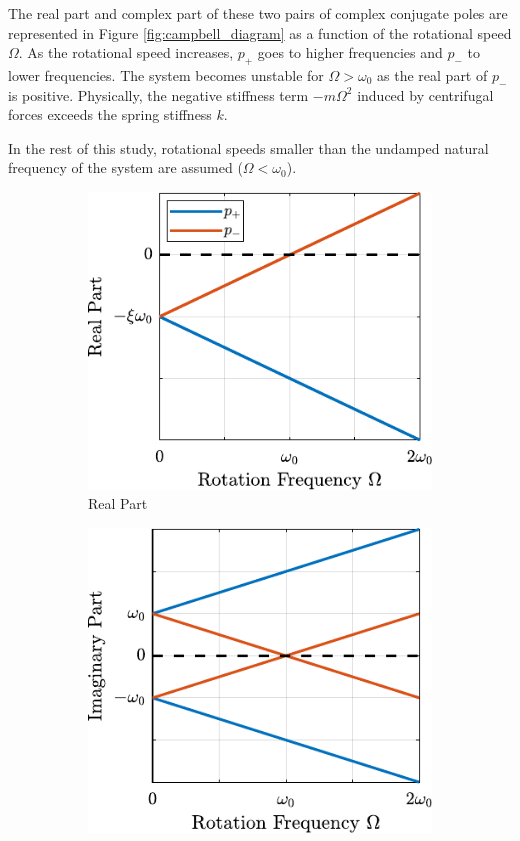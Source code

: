 \documentclass{ISMA_USD2020}
\begin{document}
The real part and complex part of these two pairs of complex conjugate poles are represented in Figure \ref{fig:campbell_diagram} as a function of the rotational speed \(\Omega\).
As the rotational speed increases, \(p_{+}\) goes to higher frequencies and \(p_{-}\) to lower frequencies.
The system becomes unstable for \(\Omega > \omega_0\) as the real part of \(p_{-}\) is positive.
Physically, the negative stiffness term \(-m\Omega^2\) induced by centrifugal forces exceeds the spring stiffness \(k\).

In the rest of this study, rotational speeds smaller than the undamped natural frequency of the system are assumed (\(\Omega < \omega_0\)).

\begin{figure}[htbp]
\begin{subfigure}[c]{0.4\linewidth}
\includegraphics[width=\linewidth]{figs/campbell_diagram_real.pdf}
\caption{\label{fig:campbell_diagram_real} Real Part}
\end{subfigure}
\begin{subfigure}[c]{0.4\linewidth}
\includegraphics[width=\linewidth]{figs/campbell_diagram_imag.pdf}

\end{subfigure}
\end{figure}
\end{document}
